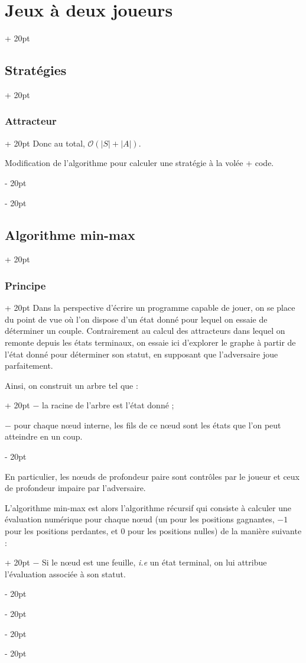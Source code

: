 \documentclass[a4paper, 12pt, twoside]{article}
\newcommand{\abs}[1]{\left\lvert #1 \right\rvert}
\newcommand{\ind}[1][20pt]{\advance\leftskip + #1}
\newcommand{\deind}[1][20pt]{\advance\leftskip - #1}
\newenvironment{indt}[2][20pt]{#2 \par \ind[#1]}{\par \deind} %
\begin{document}
\begin{indt}{\section{Jeux à deux joueurs}}
\begin{indt}{\subsection{Stratégies}}
\begin{indt}{\subsubsection{Attracteur}}
                Donc au total, $\mathcal O(\abs S + \abs A)$.

                \vspace{12pt}
                
                 Modification de l'algorithme pour calculer une stratégie à la volée + code.
            \end{indt}
        \end{indt}

        \vspace{12pt}
        
        \begin{indt}{\subsection{Algorithme min-max}}
            \begin{indt}{\subsubsection{Principe}}
                Dans la perspective d'écrire un programme capable de jouer, on se place du point de vue où l'on dispose d'un état donné pour lequel on essaie de déterminer un couple. Contrairement au calcul des attracteurs dans lequel on remonte depuis les états terminaux, on essaie ici d'explorer le graphe à partir de l'état donné pour déterminer son statut, en supposant que l'adversaire joue parfaitement.

                \begin{indt}{Ainsi, on construit un arbre tel que :}
                    $-$ la racine de l'arbre est l'état donné ;

                    $-$ pour chaque n\oe ud interne, les fils de ce n\oe ud sont les états que l'on peut atteindre en un coup.
                \end{indt}

                En particulier, les n\oe uds de profondeur paire sont contrôles par le joueur et ceux de profondeur impaire par l'adversaire.

                \begin{indt}{L'algorithme min-max est alors l'algorithme récursif qui consiste à calculer une évaluation numérique pour chaque n\oe ud (un pour les positions gagnantes, $-1$ pour les positions perdantes, et 0 pour les positions nulles) de la manière suivante :}
                    $-$ Si le n\oe ud est une feuille, \textit{i.e} un état terminal, on lui attribue l'évaluation associée à son statut.


\end{indt}
\end{indt}
\end{indt}
\end{indt}
\end{document}
